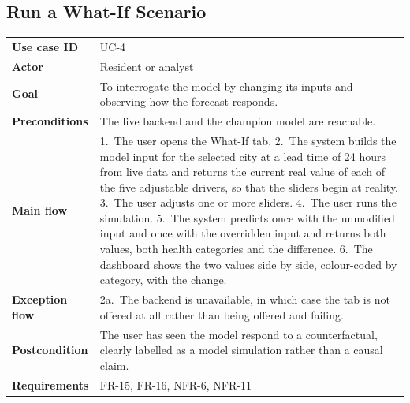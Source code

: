 \subsection{Run a What-If Scenario}
\begin{xltabular}{\textwidth}{Q{2.9cm} Y}
\toprule
\bfseries Use case ID & UC-4 \\
\bfseries Actor & Resident or analyst \\
\bfseries Goal & To interrogate the model by changing its inputs and observing
how the forecast responds. \\
\bfseries Preconditions & The live backend and the champion model are reachable. \\
\bfseries Main flow & 1.~The user opens the What-If tab. 2.~The system builds the
model input for the selected city at a lead time of 24 hours from live data and
returns the current real value of each of the five adjustable drivers, so that
the sliders begin at reality. 3.~The user adjusts one or more sliders.
4.~The user runs the simulation. 5.~The system predicts once with the unmodified
input and once with the overridden input and returns both values, both health
categories and the difference. 6.~The dashboard shows the two values side by
side, colour-coded by category, with the change. \\
\bfseries Exception flow & 2a.~The backend is unavailable, in which case the tab
is not offered at all rather than being offered and failing. \\
\bfseries Postcondition & The user has seen the model respond to a
counterfactual, clearly labelled as a model simulation rather than a causal
claim. \\
\bfseries Requirements & FR-15, FR-16, NFR-6, NFR-11 \\
\bottomrule
\end{xltabular}

